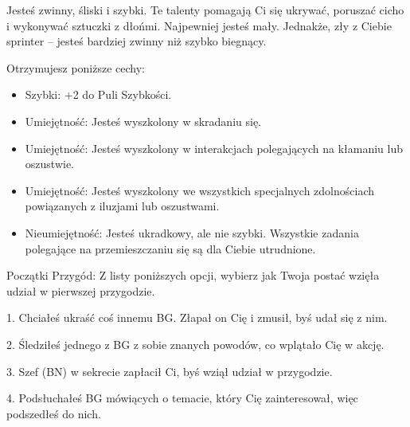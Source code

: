 Jesteś zwinny, śliski i szybki. Te talenty pomagają Ci się ukrywać, poruszać cicho i wykonywać sztuczki z dłońmi. Najpewniej jesteś mały. Jednakże, zły z Ciebie sprinter – jesteś bardziej zwinny niż szybko biegnący.

Otrzymujesz poniższe cechy:
\begin{itemize}
    \item  Szybki: +2 do Puli Szybkości.
    \item  Umiejętność: Jesteś wyszkolony w skradaniu się.
    \item  Umiejętność: Jesteś wyszkolony w interakcjach polegających na kłamaniu lub oszustwie.
    \item  Umiejętność: Jesteś wyszkolony we wszystkich specjalnych zdolnościach powiązanych z iluzjami lub oszustwami.
    \item  Nieumiejętność:  Jesteś ukradkowy, ale nie szybki. Wszystkie zadania polegające na przemieszczaniu się są dla Ciebie utrudnione. 
\end{itemize}

Początki Przygód: Z listy poniższych opcji, wybierz jak Twoja postać wzięła udział w pierwszej przygodzie.

1. Chciałeś ukraść coś innemu BG. Złapał on Cię i zmusił, byś udał się z nim.

2. Śledziłeś jednego z BG z sobie znanych powodów, co wplątało Cię w akcję.

3. Szef (BN) w sekrecie zapłacił Ci, byś wziął udział w przygodzie.

4. Podsłuchałeś BG mówiących o temacie, który Cię zainteresował, więc podszedłeś do nich.

